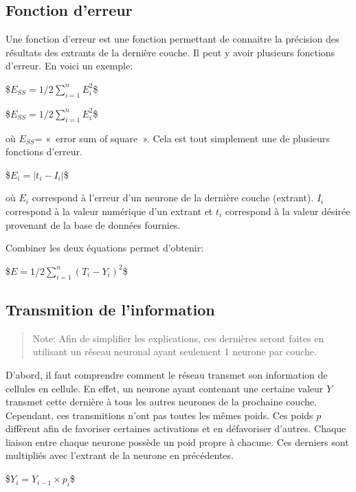 \documentclass[letterpaper,10pt,french]{sphinxmanual}
\begin{document}
\subsection{Fonction d’erreur}
\label{\detokenize{OCR_SAM:fonction-d-erreur}}
Une fonction d’erreur est une fonction permettant de connaitre la précision des résultats des extrants de la dernière couche. Il peut y avoir plusieurs fonctions d’erreur. En voici un exemple:

\$\(E_{SS}=1/2\sum_{i=1}^nE_i^2 \)\$ 

\$\(E_{SS}=1/2\sum_{i=1}^nE_i^2 \)\$ 

où \(E_{SS}\)= « error sum of square ». Cela est tout simplement une de plusieurs fonctions d’erreur.

\$\(E_i =|{t_i-I_i}|\)\$ 

où \(E_i\) correspond à l’erreur d’un neurone de la dernière couche (extrant). \(I_i\) correspond à la valeur numérique d’un extrant et \(t_i\) correspond à la valeur désirée provenant de la base de données fournies.

Combiner les deux équations permet d’obtenir:

\$\(E=1/2\sum_{i=1}^n({T_i-Y_i})^2 \)\$ 


\subsection{Transmition de l’information}
\label{\detokenize{OCR_SAM:transmition-de-l-information}}\begin{quote}

Note: Afin de simplifier les explications, ces dernières seront faites en utilisant un réseau neuronal ayant seulement 1 neurone par couche.
\end{quote}

D’abord, il faut comprendre comment le réseau transmet son information de cellules en cellule. En effet, un neurone ayant contenant une certaine valeur \(Y\) transmet cette dernière à tous les autres neurones de la prochaine couche. Cependant, ces transmitions n’ont pas toutes les mêmes poids. Ces poids \(p\) diffèrent afin de favoriser certaines activations et en défavoriser d’autres. Chaque liaison entre chaque neurone possède un poid propre à chacune. Ces derniers sont multipliés avec l’extrant de la neurone en précédentes.

\$\(Y_{i} = Y_{i-1}\times p_{i}\)\$
\end{document}
